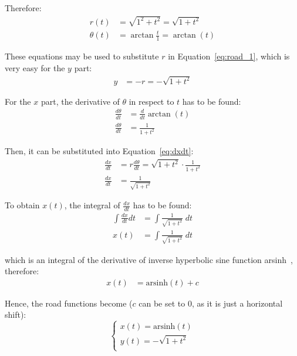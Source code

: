 \documentclass[12pt]{article}
\begin{document}
        Therefore:
        \begin{align}
            r(t) &= \sqrt{1^2 + t^2} = \sqrt{1+t^2} \\
            \theta(t) &= \arctan\frac{t}{1} = \arctan(t)
        \end{align}

        These equations may be used to substitute $r$ in Equation~\ref{eq:road_1}, which is very easy for the $y$ part:
        \begin{align}
            y &= -r = -\sqrt{1+t^2}
        \end{align}

        For the $x$ part, the derivative of $\theta$ in respect to $t$ has to be found:
        \begin{align}
            \frac{d\theta}{dt} &= \frac{d}{dt} \arctan(t) \\
            \frac{d\theta}{dt} &= \frac{1}{1+t^2}
        \end{align}

        Then, it can be substituted into Equation~\ref{eq:dxdt}:
        \begin{align}
            \frac{dx}{dt} &= r \frac{d\theta}{dt} = \sqrt{1+t^2} \cdot \frac{1}{1+t^2} \\
            \frac{dx}{dt} &= \frac{1}{\sqrt{1+t^2}}
        \end{align}

        To obtain $x(t)$, the integral of $\frac{dx}{dt}$ has to be found:
        \begin{align}
            \int \frac{dx}{dt} dt &= \int \frac{1}{\sqrt{1+t^2}} \;dt \\
            x(t) &= \int \frac{1}{\sqrt{1+t^2}} \;dt
        \end{align}

        which is an integral of the derivative of inverse hyperbolic sine function arsinh~\cite{oxford_dict}, therefore:
        \begin{align}
            x(t) &= \text{arsinh}(t) + c 
        \end{align}

        Hence, the road functions become ($c$ can be set to 0, as it is just a horizontal shift):
        \begin{equation}\label{eq:road_2}
            \begin{cases}
                x(t) = \text{arsinh}(t) \\
                y(t) = -\sqrt{1+t^2} \\
            \end{cases}
        \end{equation}
\end{document}
